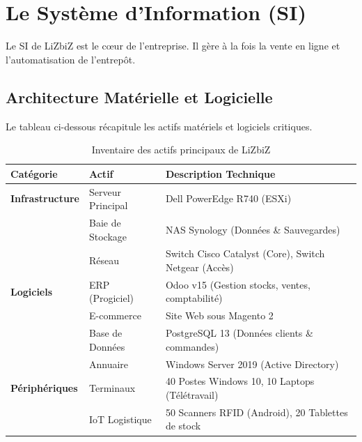 \section{Le Système d'Information (SI)}

Le SI de LiZbiZ est le cœur de l'entreprise. Il gère à la fois la vente en ligne et l'automatisation de l'entrepôt.

\subsection{Architecture Matérielle et Logicielle}

Le tableau ci-dessous récapitule les actifs matériels et logiciels critiques.

\begin{table}[htbp]
\centering
\begin{tabular}{p{3cm}p{4cm}p{6cm}}
    \toprule
    \textbf{Catégorie} & \textbf{Actif} & \textbf{Description Technique} \\
    \midrule
    \textbf{Infrastructure} & Serveur Principal & Dell PowerEdge R740 (ESXi) \\
                            & Baie de Stockage & NAS Synology (Données \& Sauvegardes) \\
                            & Réseau & Switch Cisco Catalyst (Core), Switch Netgear (Accès) \\
    \midrule
    \textbf{Logiciels} & ERP (Progiciel) & Odoo v15 (Gestion stocks, ventes, comptabilité) \\
                       & E-commerce & Site Web sous Magento 2 \\
                       & Base de Données & PostgreSQL 13 (Données clients \& commandes) \\
                       & Annuaire & Windows Server 2019 (Active Directory) \\
    \midrule
    \textbf{Périphériques} & Terminaux & 40 Postes Windows 10, 10 Laptops (Télétravail) \\
                           & IoT Logistique & 50 Scanners RFID (Android), 20 Tablettes de stock \\
    \bottomrule
\end{tabular}
\caption{Inventaire des actifs principaux de LiZbiZ}
\end{table}


